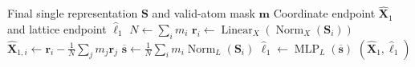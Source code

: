 \begin{algorithm}[H]
\caption{Coordinate and lattice prediction heads}
\label{alg:prediction-heads}
\begin{algorithmic}[1]
\Require Final single representation $\mathbf S$ and valid-atom mask $\mathbf m$
\Ensure Coordinate endpoint $\widehat{\mathbf X}_1$ and lattice endpoint
$\widehat{\boldsymbol\ell}_1$
\State $N\gets\sum_i m_i$
\State $\mathbf r_i\gets
    \operatorname{Linear}_X(\operatorname{Norm}_X(\mathbf S_i))$
\State $\displaystyle
    \widehat{\mathbf X}_{1,i}\gets\mathbf r_i-
    \frac{1}{N}\sum_jm_j\mathbf r_j$
\Statex
{}
\State $\displaystyle
    \overline{\mathbf s}\gets\frac{1}{N}\sum_i m_i
    \operatorname{Norm}_L(\mathbf S_i)$
\State $\widehat{\boldsymbol\ell}_1\gets
    \operatorname{MLP}_L(\overline{\mathbf s})$
\State \Return $(\widehat{\mathbf X}_1,\widehat{\boldsymbol\ell}_1)$
\end{algorithmic}
\end{algorithm}
